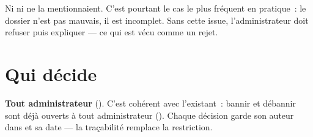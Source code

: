 \begin{note}
Ni  ni  ne la mentionnaient. C'est
pourtant le cas le plus fréquent en pratique~: le dossier n'est pas mauvais, il est
incomplet. Sans cette issue, l'administrateur doit refuser puis expliquer --- ce qui est
vécu comme un rejet.
\end{note}

\section{Qui décide}

\textbf{Tout administrateur} (). C'est cohérent avec l'existant~:
bannir et débannir sont déjà ouverts à tout administrateur
(). Chaque décision garde son auteur dans  et
sa date --- la traçabilité remplace la restriction.
